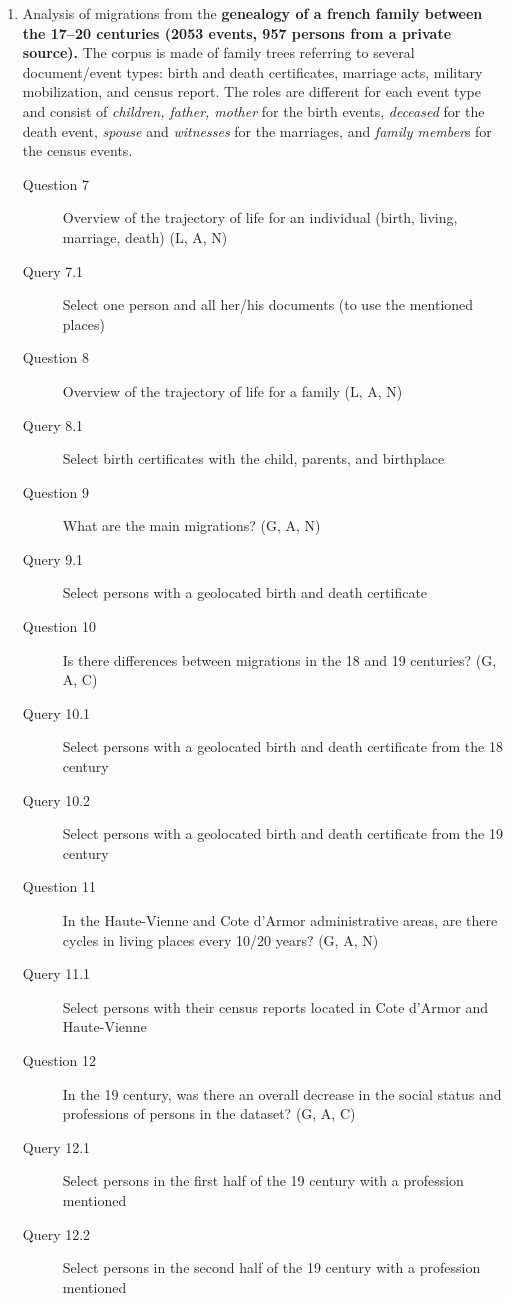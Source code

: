 \begin{enumerate}
    \item Analysis of migrations from the \textbf{genealogy of a french family between the 17--20 centuries (2053 events, 957 persons from a private source).}
    The corpus is made of family trees referring to several document/event types: birth and death certificates, marriage acts, military mobilization, and census report. The roles are different for each event type and consist of \textit{children, father, mother} for the birth events, \textit{deceased} for the death event, \textit{spouse} and \textit{witnesses} for the marriages, and \textit{family member}s for the census events.
    \begin{footnotesize}
    \begin{description}
    \item[Question 7] Overview of the trajectory of life for an individual (birth, living, marriage, death) (L, A, N)
    \item[\myindent Query 7.1] Select one person and all her/his documents (to use the mentioned places)
    \item[Question 8] Overview of the trajectory of life for a family (L, A, N)
    \item[\myindent Query 8.1] Select birth certificates with the child, parents, and birthplace
    \item[Question 9] What are the main migrations? (G, A, N)
    \item[\myindent Query 9.1] Select persons with a geolocated birth and death certificate
    \item[Question 10] Is there differences between migrations in the 18 and 19 centuries? (G, A, C)
    \item[\myindent Query 10.1] Select persons with a geolocated birth and death certificate from the 18 century
    \item[\myindent Query 10.2] Select persons with a geolocated birth and death certificate from the 19 century
    \item[Question 11] In the Haute-Vienne and Cote d'Armor administrative areas, are there cycles in living places every 10/20 years? (G, A, N)
    \item[\myindent Query 11.1] Select persons with their census reports located in Cote d’Armor and Haute-Vienne
    \item[Question 12] In the 19 century, was there an overall decrease in the social status and professions of persons in the dataset? (G, A, C)
    \item[\myindent Query 12.1] Select persons in the first half of the 19 century with a profession mentioned
    \item[\myindent Query 12.2] Select persons in the second half of the 19 century with a profession mentioned
    \end{description}
    \end{footnotesize}


\end{enumerate}
